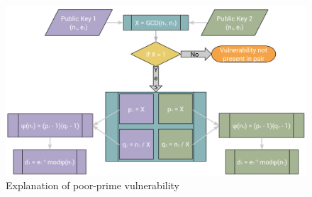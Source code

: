 \documentclass[12pt]{ucthesis}
\begin{document}

\begin{figure}
   \centering
   \includegraphics[width=\textwidth]{vulnerability}
   \caption{Explanation of poor-prime vulnerability}
   \label{fig:vuln}
\end{figure}

\end{document}
